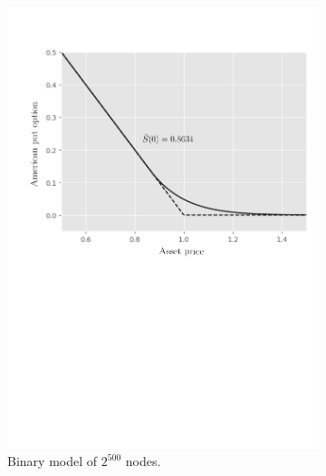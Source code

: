 \begin{figure}[H]
  \centering
  \begin{subfigure}{0.435\textwidth}
    \label{fig:finitedifferencesschemes:numericaresults:test_case_2_bopm}
    \centering
    \includegraphics[width=\textwidth]{chapters/chapter3/TestCase2BOPM.pdf}
    \caption{Binary model of $2^{500}$ nodes.}
  \vspace{0.5cm}
  \end{subfigure}
  \begin{subfigure}{0.4\textwidth}
    \label{fig:finitedifferencesschemes:numericaresults:test_case_2_explicit_nielsen}
    \centering

\end{subfigure}
\end{figure}
